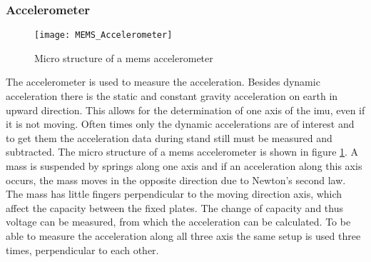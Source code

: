 \subsubsection{ Accelerometer}
\begin{figure}[htb]
	\centering
	\texttt{[image: MEMS\_Accelerometer]}
	\caption{Micro structure of a \acrshort{mems} accelerometer }
	\label{fig:MEMS_Accelerometer}
\end{figure}
The accelerometer is used to measure the acceleration.
Besides dynamic acceleration there is the static and constant gravity acceleration on earth in upward direction.
This allows for the determination of one axis of the \acrshort{imu}, even if it is not moving.
Often times only the dynamic accelerations are of interest and to get them the acceleration data during stand still must be measured and subtracted.
The micro structure of a \acrshort{mems} accelerometer is shown in figure \ref{fig:MEMS_Accelerometer}.
A mass is suspended by springs along one axis and if an acceleration along this axis occurs, the mass moves in the opposite direction due to Newton's second law.
The mass has little fingers perpendicular to the moving direction axis, which affect the capacity between the fixed plates.
The change of capacity and thus voltage can be measured, from which the acceleration can be calculated.
To be able to measure the acceleration along all three axis the same setup is used three times, perpendicular to each other.

